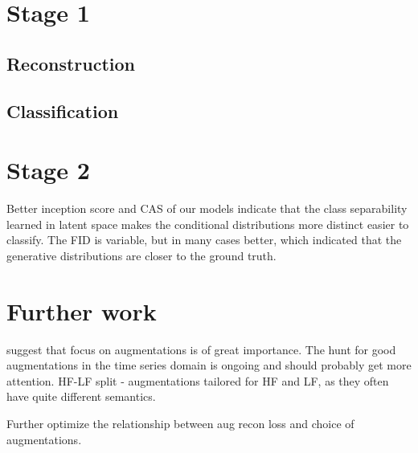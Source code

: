 \documentclass[../../thesis.tex]{subfiles}
\begin{document}
\section{Stage 1}

\subsection{Reconstruction}



\subsection{Classification}
\section{Stage 2}

Better inception score and CAS of our models indicate that the class separability learned in latent space makes the conditional distributions more distinct easier to classify. The FID is variable, but in many cases better, which indicated that the generative distributions are closer to the ground truth.

\section{Further work}
\cite{morningstar2024augmentations} suggest that focus on augmentations is of great importance. The hunt for good augmentations in the time series domain is ongoing and should probably get more attention.\newline
HF-LF split - augmentations tailored for HF and LF, as they often have quite different semantics.\newline

Further optimize the relationship between aug recon loss and choice of augmentations.
\end{document}
